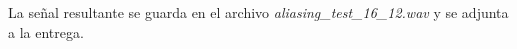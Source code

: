\begin{enumerate}
La señal resultante se guarda en el archivo \textit{aliasing\_test\_16\_12.wav} y se adjunta a la entrega.

\end{enumerate}

